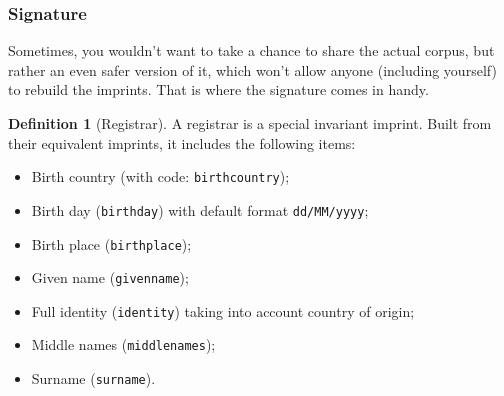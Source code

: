 \documentclass[twoside,twocolumn]{article}
\theoremstyle{definition}
\newtheorem{definition}{Definition}
\theoremstyle{remark}
\begin{document}
\subsubsection{Signature}

Sometimes, you wouldn't want to take a chance to share the actual corpus, but rather an even safer version of it, which won't allow anyone (including 
yourself) to rebuild the imprints. That is where the signature comes in handy.

\begin{definition}[Registrar]
    \label{registrar}
    A registrar is a special invariant imprint. Built from their equivalent imprints, it includes the following items:
    \begin{itemize}
        \item Birth country (with code: \texttt{birthcountry});
        \item Birth day (\texttt{birthday}) with default format \texttt{dd/MM/yyyy};
        \item Birth place (\texttt{birthplace});
        \item Given name (\texttt{givenname});
        \item Full identity (\texttt{identity}) taking into account country of origin;
        \item Middle names (\texttt{middlenames});
        \item Surname (\texttt{surname}).
    \end{itemize}
\end{definition}
\end{document}
